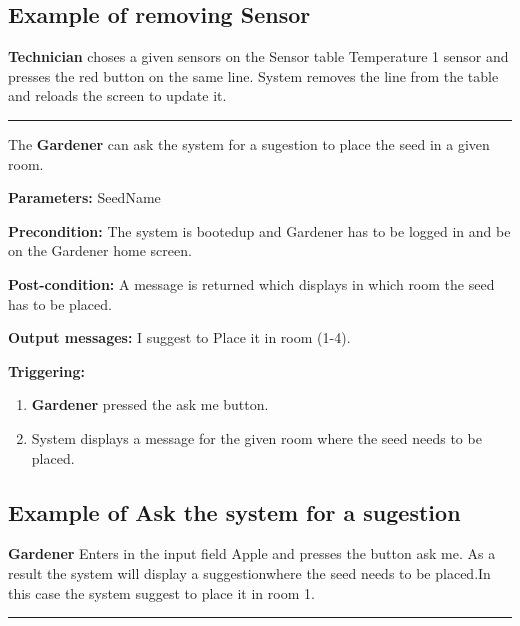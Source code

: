 \subsection{Example of removing Sensor}
\textbf{Technician} choses a given sensors on the Sensor table Temperature 1
sensor and presses the red button on the same line.
System removes the line from the table and reloads the screen to update it.

 \hfill
\vspace{0.5cm}
\hrule









\label{operation:AskSystemForASugestion}

The \textbf{Gardener} can ask the system for a sugestion to place the seed in a
given room.
\begin{description}

\item \textbf{Parameters:} SeedName
\item \textbf{Precondition:} The system is bootedup and Gardener has to be
logged in and be on the Gardener home screen.
\item \textbf{Post-condition:} A message is returned which displays in which
room the seed has to be placed.
\item \textbf{Output messages:} I suggest to Place it in room (1-4).
\item \textbf{Triggering:}
\begin{enumerate}
\item \textbf{Gardener} pressed the ask me button.
\item System displays a message for the given room where the seed needs to be
placed.
\end{enumerate}
\end{description}

\subsection{Example of Ask the system for a sugestion}
\textbf{Gardener} Enters in the input field Apple and presses the button ask me.
As a result the system will display a suggestionwhere the seed needs to be
placed.In this case the system suggest to place it in room 1.

 \hfill
\vspace{0.5cm}
\hrule














